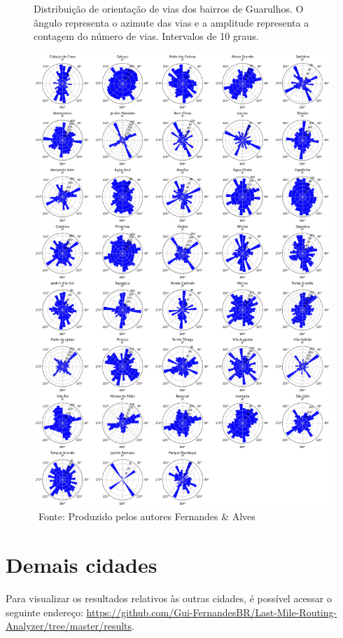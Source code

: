 \begin{figure}[H]
    \centering
    \caption{Distribuição de orientação de vias dos bairros de Guarulhos. O ângulo representa o azimute das vias e a amplitude representa a contagem do número de vias. Intervalos de 10 graus.}
    \includegraphics[width=.9\textwidth]{images/8_appendix/polar_plots_guarulhos.png}
    \caption*{\ Fonte: Produzido pelos autores Fernandes \& Alves}
    \label{fig:bearing_bairros}
\end{figure}


\section{Demais cidades}

Para visualizar os resultados relativos às outras cidades, é possível acessar o seguinte endereço: \url{https://github.com/Gui-FernandesBR/Last-Mile-Routing-Analyzer/tree/master/results}.
